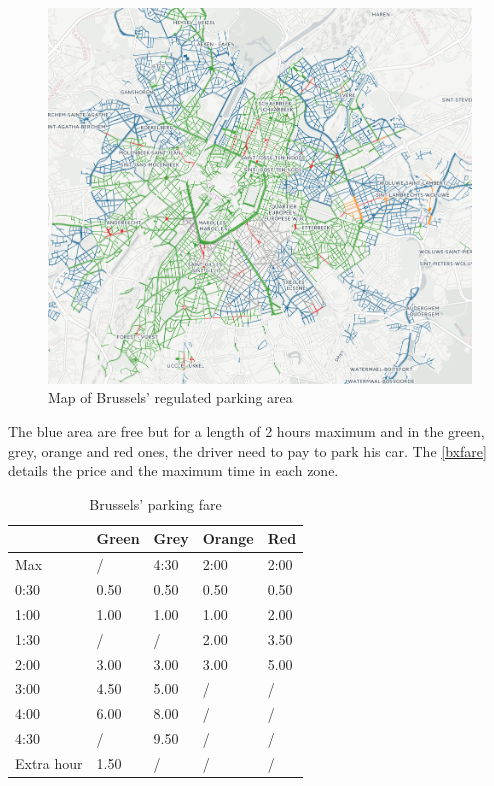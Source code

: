 \documentclass[12pt,a4paper,oneside]{book}
\begin{document}
\begin{figure}[h]
\centering
\caption{Map of Brussels' regulated parking area}
\label{bxmap}
\includegraphics[keepaspectratio=true,width=\textwidth-2cm]{images/bxpark.png}
\end{figure}


The blue area are free but for a length of 2 hours maximum and in the green, grey, orange and red ones, the driver need to pay to park his car. The \autoref{bxfare} details the price and the maximum time in each zone.\\

\begin{table}[h]
\centering
\caption{Brussels' parking fare}
\label{bxfare}
\begin{tabular}{|l|l|l|l|l|}
\hline
           & Green & Grey & Orange & Red  \\ \hline
Max        & /     & 4:30 & 2:00   & 2:00 \\ \hline
0:30       & 0.50  & 0.50 & 0.50   & 0.50 \\ \hline
1:00       & 1.00  & 1.00 & 1.00   & 2.00 \\ \hline
1:30       & /     & /    & 2.00   & 3.50 \\ \hline
2:00       & 3.00  & 3.00 & 3.00   & 5.00 \\ \hline
3:00       & 4.50  & 5.00 & /      & /    \\ \hline
4:00       & 6.00  & 8.00 & /      & /    \\ \hline
4:30       & /     & 9.50 & /      & /    \\ \hline
Extra hour & 1.50  & /    & /      & /    \\ \hline
\end{tabular}
\end{table}
\end{document}

